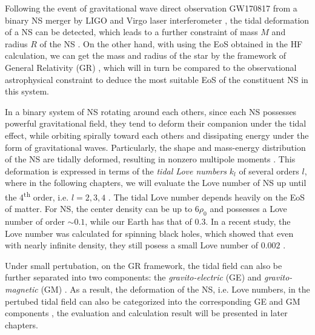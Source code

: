 Following the event of gravitational wave direct observation GW170817 from a binary \gls{NS} merger by LIGO and Virgo laser interferometer \cite{abbott2017gw170817}, the tidal deformation of a \gls{NS} can be detected, which leads to a further constraint of mass $M$ and radius $R$ of the \gls{NS} \cite{abbott2018gw170817}. On the other hand, with using the \gls{EoS} obtained in the \gls{HF} calculation, we can get the mass and radius of the star by the framework of General Relativity (\gls{GR}) \cite{tan2020spin,tan2021equation}, which will in turn be compared to the observational astrophysical constraint to deduce the most suitable \gls{EoS} of the constituent \gls{NS} in this system.\par
In a binary system of \gls{NS} rotating around each others, since each \gls{NS} possesses powerful gravitational field, they tend to deform their companion under the tidal effect, while orbiting spirally toward each others and dissipating energy under the form of gravitational waves. Particularly, the shape and mass-energy distribution of the \gls{NS} are tidally deformed, resulting in nonzero multipole moments \cite{hinderer2008tidal,hinderer2010tidal,damour2009relativistic}. This deformation is expressed in terms of the \emph{tidal Love numbers} $k_l$ of several orders $l$, where in the following chapters, we will evaluate the Love number of \gls{NS} up until the 4\textsuperscript{th} order, i.e. $l=2,3,4$ \cite{perot2021role}. The tidal Love number depends heavily on the \gls{EoS} of matter. For \gls{NS}, the center density can be up to $6\rho_0$ and possesses a Love number of order $\sim 0.1$, while our Earth has that of $0.3$. In a recent study, the Love number was calculated for spinning black holes, which showed that even with nearly infinite density, they still posess a small Love number of $0.002$ \cite{le2021spinning}.\par
Under small pertubation, on the \gls{GR} framework, the tidal field can also be further separated into two components: the \emph{gravito-electric} (\gls{GE}) and \emph{gravito-magnetic} (\gls{GM}) \cite{damour2009relativistic}. As a result, the deformation of the \gls{NS}, i.e. Love numbers, in the pertubed tidal field can also be categorized into the corresponding \gls{GE} and \gls{GM} components \cite{perot2021role}, the evaluation and calculation result will be presented in later chapters.
